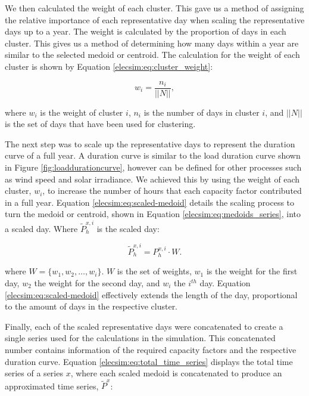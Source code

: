 We then calculated the weight of each cluster. This gave us a method of assigning the relative importance of each representative day when scaling the representative days up to a year. The weight is calculated by the proportion of days in each cluster. This gives us a method of determining how many days within a year are similar to the selected medoid or centroid. The calculation for the weight of each cluster is shown by Equation \ref{elecsim:eq:cluster_weight}:

\begin{equation}
\label{elecsim:eq:cluster_weight}
w_i = \frac{n_i}{||N||},
\end{equation} 

\noindent where $w_i$ is the weight of cluster $i$, $n_i$ is the number of days in cluster $i$, and $||N||$ is the set of days that have been used for clustering. 


The next step was to scale up the representative days to represent the duration curve of a full year. A duration curve is similar to the load duration curve shown in Figure \ref{fig:loaddurationcurve}, however can be defined for other processes such as wind speed and solar irradiance. We achieved this by using the weight of each cluster, $w_i$, to increase the number of hours that each capacity factor contributed in a full year. Equation \ref{elecsim:eq:scaled-medoid} details the scaling process to turn the medoid or centroid, shown in Equation \ref{elecsim:eq:medoids_series}, into a scaled day. Where $\widetilde{P}^{x,i}_{h}$ is the scaled day:

\begin{equation}
\label{elecsim:eq:scaled-medoid}
\widetilde{P}^{x,i}_{h} = P_h^{x,i}\cdot W.
\end{equation} 

\noindent where $W=\{w_1,w_2,\ldots,w_i\}$. $W$ is the set of weights, $w_1$ is the weight for the first day, $w_2$ the weight for the second day, and $w_i$ the $i^{th}$ day. Equation \ref{elecsim:eq:scaled-medoid} effectively extends the length of the day, proportional to the amount of days in the respective cluster.



Finally, each of the scaled representative days were concatenated to create a single series used for the calculations in the simulation. This concatenated number contains information of the required capacity factors and the respective duration curve. Equation \ref{elecsim:eq:total_time_series} displays the total time series of a series $x$, where each scaled medoid is concatenated to produce an approximated time series, $\widetilde{P}^x$:


